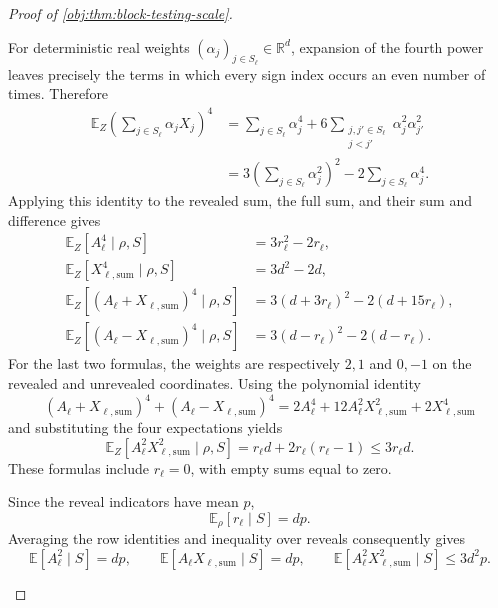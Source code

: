 \begin{proof}[Proof of \cref{obj:thm:block-testing-scale}]
\begin{enumerate}
For deterministic real weights \((\alpha_j)_{j\in S_\ell}\in\mathbb R^d\), expansion of the fourth power leaves precisely the terms in which every sign index occurs an even number of times. Therefore
\[
\begin{aligned}
\mathbb E_Z\left(\sum_{j\in S_\ell}\alpha_jX_j\right)^4
&=
\sum_{j\in S_\ell}\alpha_j^4
+
6\sum_{\substack{j,j'\in S_\ell\\j<j'}}
\alpha_j^2\alpha_{j'}^2\\
&=
3\left(\sum_{j\in S_\ell}\alpha_j^2\right)^2
-2\sum_{j\in S_\ell}\alpha_j^4.
\end{aligned}
\]
Applying this identity to the revealed sum, the full sum, and their sum and difference gives
\[
\begin{aligned}
\mathbb E_Z[A_\ell^4\mid\rho,S]
&=3r_\ell^2-2r_\ell,\\
\mathbb E_Z[X_{\ell,\mathrm{sum}}^4\mid\rho,S]
&=3d^2-2d,\\
\mathbb E_Z[(A_\ell+X_{\ell,\mathrm{sum}})^4\mid\rho,S]
&=3(d+3r_\ell)^2-2(d+15r_\ell),\\
\mathbb E_Z[(A_\ell-X_{\ell,\mathrm{sum}})^4\mid\rho,S]
&=3(d-r_\ell)^2-2(d-r_\ell).
\end{aligned}
\]
For the last two formulas, the weights are respectively \(2,1\) and \(0,-1\) on the revealed and unrevealed coordinates. Using the polynomial identity
\[
(A_\ell+X_{\ell,\mathrm{sum}})^4
+(A_\ell-X_{\ell,\mathrm{sum}})^4
=
2A_\ell^4+12A_\ell^2X_{\ell,\mathrm{sum}}^2
+2X_{\ell,\mathrm{sum}}^4
\]
and substituting the four expectations yields
\[
\mathbb E_Z[
A_\ell^2X_{\ell,\mathrm{sum}}^2\mid\rho,S]
=
r_\ell d+2r_\ell(r_\ell-1)
\le3r_\ell d.
\]
These formulas include \(r_\ell=0\), with empty sums equal to zero.

Since the reveal indicators have mean \(p\),
\[
\mathbb E_\rho[r_\ell\mid S]=dp.
\]
Averaging the row identities and inequality over reveals consequently gives
\[
\mathbb E[A_\ell^2\mid S]=dp,
\qquad
\mathbb E[A_\ell X_{\ell,\mathrm{sum}}\mid S]=dp,
\qquad
\mathbb E[A_\ell^2X_{\ell,\mathrm{sum}}^2\mid S]
\le3d^2p.
\]


\end{enumerate}
\end{proof}
